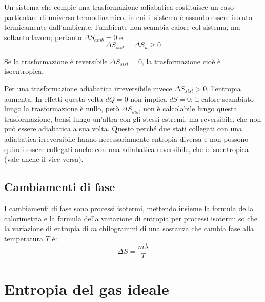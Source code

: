 \documentclass[class=book, crop=false, oneside, 12pt]{standalone}
\begin{document}
Un sistema che compie una trasformazione adiabatica costituisce un caso particolare di universo termodinamico, in cui il sistema è assunto essere isolato termicamente dall'ambiente: l'ambiente non scambia calore col sistema, ma soltanto lavoro; pertanto \(\Delta S_{amb} = 0\) e 
\begin{equation*}
    \Delta S_{sist} = \Delta S_u \geq 0 
\end{equation*}

Se la trasformazione è reversibile \(\Delta S_{sist} = 0\), la trasformazione cioè è isoentropica.

Per una trasformazione adiabatica irreversibile invece \(\Delta S_{sist}> 0 \), l'entropia aumenta. 
In effetti questa volta \(d Q =0\) non implica \(d S =0\): il calore scambiato lungo la trasformazione è nullo, però \(\Delta S_{sist}\) non è calcolabile lungo questa trasformazione, bensì lungo un'altra con gli stessi estremi, ma reversibile, che non può essere adiabatica a sua volta. 
Questo perché due stati collegati con una adiabatica irreversibile hanno necessariamente entropia diversa e non possono quindi essere collegati anche con una adiabatica reversibile, che è isoentropica (vale anche il vice versa).

\subsection{Cambiamenti di fase}

I cambiamenti di fase sono processi isotermi, mettendo insieme la formula della calorimetria e la formula della variazione di entropia per processi isotermi so che la variazione di entropia di \(m\) chilogrammi di una sostanza che cambia fase alla temperatura \(T\) è:
\begin{equation}
    \Delta S = \frac{m \lambda}{T}
\end{equation}

\section{Entropia del gas ideale}
\end{document}
